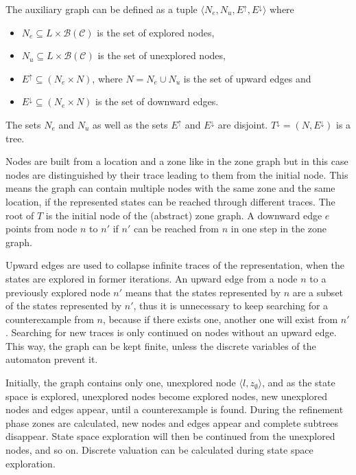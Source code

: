 \begin{dfn}
	The auxiliary graph can be defined as a tuple $\langle N_e, N_u, E^\uparrow, E^\downarrow \rangle$ where
	\begin{itemize}
		\item $N_e \subseteq L \times \mathcal{B}(\mathcal{C})$ is the set of explored nodes,
		\item $N_u \subseteq L \times \mathcal{B}(\mathcal{C})$  is the set of unexplored nodes,
		\item $E^\uparrow \subseteq (N_e \times N)$, where $N = N_e \cup N_u$ is the set of upward edges and
		\item $E^\downarrow \subseteq (N_e \times N)$  is the set of downward edges.
	\end{itemize}
	 The sets $N_e$ and $N_u$ as well as the sets $E^\uparrow$ and $E^\downarrow$ are disjoint. $T^\downarrow=(N,E^\downarrow)$ is a tree.
\end{dfn}
 
Nodes are built from a location and a zone like in the zone graph but in this case nodes are distinguished by their trace leading to them from the initial node. This means the graph can contain multiple nodes with the same zone and the same location, if the represented states can be reached through different traces. The root of $T$ is the initial node of the (abstract) zone graph. A downward edge $e$ points from node $n$ to $n'$ if $n'$ can be reached from $n$ in one step in the zone graph. %

Upward edges are used to collapse infinite traces of the representation, when the states are explored in former iterations. An upward edge from a node $n$ to a previously explored node $n'$ means that the states
represented by $n$ are a subset of the states represented by $n'$, thus it is unnecessary to keep searching for a
counterexample from $n$, because if there exists one, another one will exist
from $n'$. Searching for new traces is only continued on nodes without an upward edge. This way, the graph can be kept finite, unless the discrete variables of the automaton prevent it.

Initially, the graph contains only one, unexplored node $\langle l, z_{\emptyset} \rangle$, and as the state space is explored, unexplored nodes become explored nodes, new unexplored nodes and edges appear, until a counterexample is found. During the refinement phase zones are calculated, new nodes and edges appear and complete subtrees disappear. State space exploration will then be continued from the unexplored nodes, and so on. Discrete valuation can be calculated during state space exploration.

